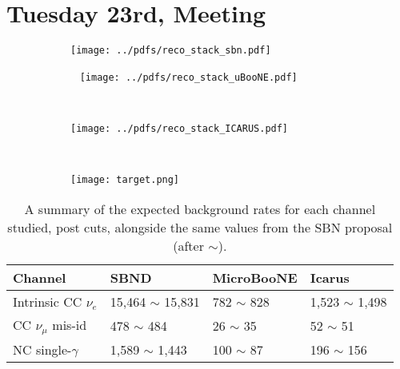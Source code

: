 \documentclass[12pt, a4paper]{article}
\begin{document}
\newpage


\section{Tuesday 23rd, Meeting}



\begin{figure}[!htb]
\centering
    \begin{subfigure}[b]{0.3\textwidth}
	  \texttt{[image: ../pdfs/reco\_stack\_sbn.pdf]}
  \end{subfigure}  
	 \begin{subfigure}[b]{0.3\textwidth}
	 ~ 
  \texttt{[image: ../pdfs/reco\_stack\_uBooNE.pdf]}
	  \end{subfigure}  
	~
	  \begin{subfigure}[b]{0.3\textwidth}
   
		  \texttt{[image: ../pdfs/reco\_stack\_ICARUS.pdf]}
	   \end{subfigure}  
	  ~\\
	  \begin{subfigure}[b]{0.95\textwidth}
\texttt{[image: target.png]}
\end{subfigure}
    \end{figure}


\begin{table}[t]
\centering
\begin{tabular}{ l | l | l | l}
	Channel & SBND & MicroBooNE & Icarus \\
\hline\hline
\multirow{1}{*}{Intrinsic CC $\nu_e$} & 15,464  $\sim$ 15,831 & 782 $\sim$  828   & 1,523 $\sim$ 1,498 \\
\multirow{1}{*}{CC $\nu_\mu$ mis-id}  & 478 $\sim$ 484  & 26 $\sim$ 35 & 52 $\sim$ 51\\
\multirow{1}{*}{NC single-$\gamma$}&  1,589 $\sim$ 1,443 & 100 $\sim$ 87  & 196 $\sim$ 156\\
 \hline \hline
\end{tabular}
\caption{\label{tab:Rates_post_cuts} A summary of the expected background rates for each channel studied, post cuts, alongside the same values from the SBN proposal (after $\sim$). }
\end{table}
\end{document}
